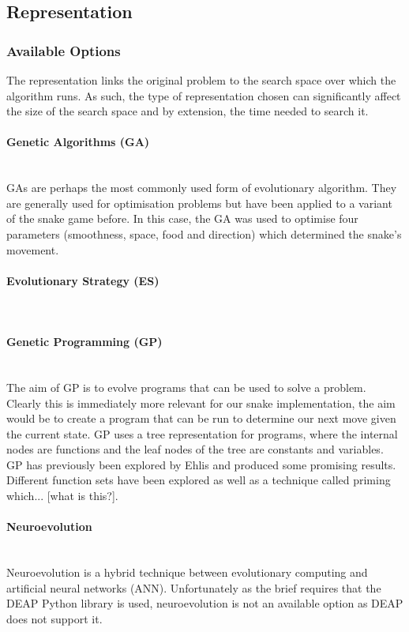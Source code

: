 \documentclass{article}
\newcommand{\myparagraph}[1]{\paragraph{#1}\mbox{}\\}
\begin{document}
\subsection{Representation}
\subsubsection{Available Options}
The representation links the original problem to the search space over which the algorithm runs. As such, the type of representation chosen can significantly affect the size of the search space and by extension, the time needed to search it. 


\myparagraph{Genetic Algorithms (GA)}
GAs are perhaps the most commonly used form of evolutionary algorithm. They are generally used for optimisation problems but have been applied to a variant of the snake game before\cite{snake_paper}. In this case, the GA was used to optimise four parameters (smoothness, space, food and direction) which determined the snake's movement.

\myparagraph{Evolutionary Strategy (ES)}


\myparagraph{Genetic Programming (GP)}
The aim of GP is to evolve programs that can be used to solve a problem. Clearly this is immediately more relevant for our snake implementation, the aim would be to create a program that can be run to determine our next move given the current state. GP uses a tree representation for programs, where the internal nodes are functions and the leaf nodes of the tree are constants and variables.
\\
GP has previously been explored by Ehlis\cite{snake_blog} and produced some promising results. Different function sets have been explored as well as a technique called priming which... [what is this?].

\myparagraph{Neuroevolution}
Neuroevolution is a hybrid technique between evolutionary computing and artificial neural networks (ANN).
Unfortunately as the brief requires that the DEAP Python library is used, neuroevolution is not an available option as DEAP does not support it.
\end{document}
